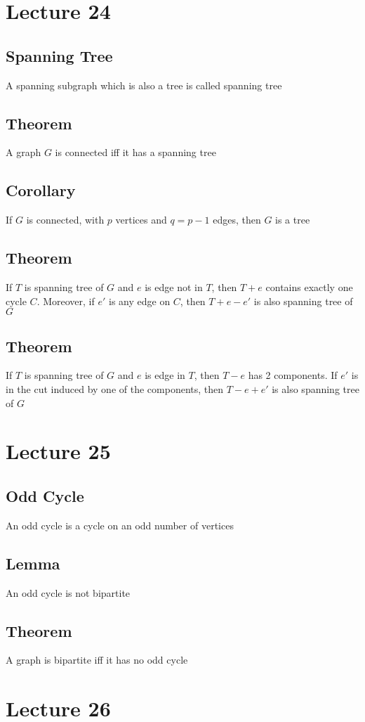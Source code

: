 \documentclass[11pt]{article}
\begin{document}
\section{Lecture 24}
\subsection{Spanning Tree}
A spanning subgraph which is also a tree is called spanning tree 
\subsection{Theorem}
A graph $G$ is connected iff it has a spanning tree
\subsection{Corollary}
If $G$ is connected, with $p$ vertices and $q=p-1$ edges, then $G$ is a tree
\subsection{Theorem}
If $T$ is spanning tree of $G$ and $e$ is edge not in $T$, then $T+e$
contains exactly one cycle $C$. Moreover, if $e'$ is any edge on $C$, then $T+e-e'$ is also spanning tree of $G$
\subsection{Theorem}
If $T$ is spanning tree of $G$ and $e$ is edge in $T$, then $T-e$ has 2 components. If $e'$ is in the cut induced by one of the components, then $T-e+e'$ is also spanning tree of $G$

\section{Lecture 25}
\subsection{Odd Cycle}
An odd cycle is a cycle on an odd number of vertices
\subsection{Lemma}
An odd cycle is not bipartite
\subsection{Theorem}
A graph is bipartite iff it has no odd cycle

\section{Lecture 26}
\end{document}
